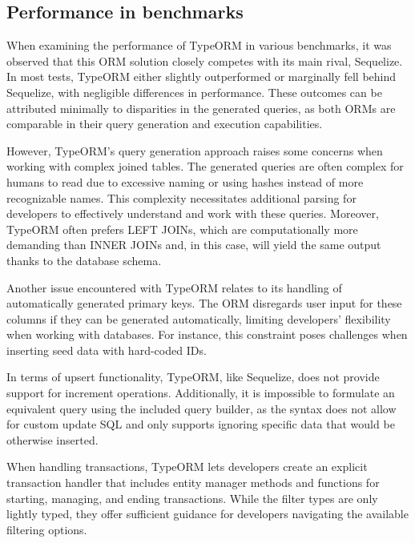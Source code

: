 \subsection*{Performance in benchmarks}

When examining the performance of TypeORM in various benchmarks, it was observed
that this ORM solution closely competes with its main rival, Sequelize. In most
tests, TypeORM either slightly outperformed or marginally fell behind Sequelize,
with negligible differences in performance. These outcomes can be attributed
minimally to disparities in the generated queries, as both ORMs are comparable
in their query generation and execution capabilities.

However, TypeORM's query generation approach raises some concerns when working
with complex joined tables. The generated queries are often complex for humans
to read due to excessive naming or using hashes instead of more recognizable
names. This complexity necessitates additional parsing for developers to
effectively understand and work with these queries. Moreover, TypeORM often
prefers LEFT JOINs, which are computationally more demanding than INNER JOINs
and, in this case, will yield the same output thanks to the database schema.

Another issue encountered with TypeORM relates to its handling of automatically
generated primary keys. The ORM disregards user input for these columns if they
can be generated automatically, limiting developers' flexibility when working
with databases. For instance, this constraint poses challenges when inserting
seed data with hard-coded IDs.

In terms of upsert functionality, TypeORM, like Sequelize, does not provide
support for increment operations. Additionally, it is impossible to formulate an
equivalent query using the included query builder, as the syntax does not allow
for custom update SQL and only supports ignoring specific data that would be
otherwise inserted.

When handling transactions, TypeORM lets developers create an explicit
transaction handler that includes entity manager methods and functions for
starting, managing, and ending transactions. While the filter types are only
lightly typed, they offer sufficient guidance for developers navigating the
available filtering options.

